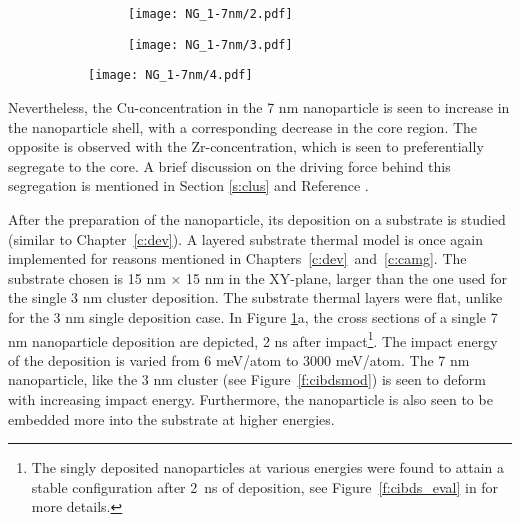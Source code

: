 \begin{figure}[!h]
	\begin{subfigure}{0.55\textwidth} \centering
		\begin{subfigure}{\textwidth} \centering
			\texttt{[image: NG\_1-7nm/2.pdf]}
		\end{subfigure}%
		\vfill
		\begin{subfigure}{\textwidth} \centering
			\texttt{[image: NG\_1-7nm/3.pdf]}
		\end{subfigure}
	\end{subfigure}%
	\hspace{0.3cm}
	\begin{subfigure}{0.45\textwidth} \centering
		\texttt{[image: NG\_1-7nm/4.pdf]}
	\end{subfigure}%
	\label{f:7nm-cibds}
\end{figure}

Nevertheless, the Cu-concentration in the 7 nm nanoparticle is seen to increase in the nanoparticle shell, with a corresponding decrease in the core region. The opposite is observed with the Zr-concentration, which is seen to preferentially segregate to the core. A brief discussion on the driving force behind this segregation is mentioned in Section \ref{s:clus} and Reference \cite{Adjaoud2016}. \par

After the preparation of the nanoparticle, its deposition on a substrate is studied (similar to Chapter~\ref{c:dev}). A layered substrate thermal model is once again implemented for reasons mentioned in Chapters~\ref{c:dev}~and~\ref{c:camg}. The substrate chosen is 15 nm $\times$ 15 nm in the XY-plane, larger than the one used for the single 3 nm cluster deposition. The substrate thermal layers were flat, unlike for the 3 nm single deposition case. In Figure \ref{f:7nm-cibds}a, the cross sections of a single 7 nm nanoparticle deposition are depicted, 2 ns after impact\footnote{The singly deposited nanoparticles at various energies were found to attain a stable configuration after \mbox{2 ns} of deposition, see Figure~\ref{f:cibds_eval} in  for more details.}. The impact energy of the deposition is varied from 6 meV/atom to 3000 meV/atom. The 7 nm nanoparticle, like the 3 nm cluster (see Figure~\ref{f:cibdsmod}) is seen to deform with increasing impact energy. Furthermore, the nanoparticle is also seen to be embedded more into the substrate at higher energies. \par


